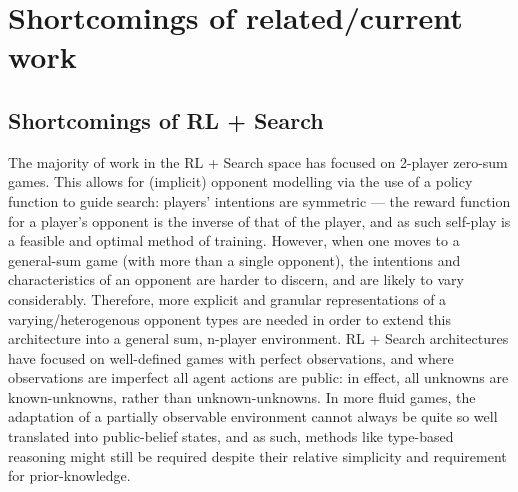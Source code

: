 \section{Shortcomings of related/current work}
\subsection{Shortcomings of RL + Search}
The majority of work in the RL + Search space has focused on 2-player zero-sum games. 
This allows for (implicit) opponent modelling via the use of a policy function to guide search: players' intentions are symmetric --- the reward function for a player's opponent is the inverse of that of the player, and as such self-play is a feasible and optimal method of training. 
However, when one moves to a general-sum game (with more than a single opponent), the intentions and characteristics of an opponent are harder to discern, and are likely to vary considerably. Therefore, more explicit and granular representations of a varying/heterogenous opponent types are needed in order to extend this architecture into a general sum, n-player environment.
\newline \newline
RL + Search architectures have focused on well-defined games with perfect observations, and where observations are imperfect all agent actions are public: in effect, all unknowns are known-unknowns, rather than unknown-unknowns. In more fluid games, the adaptation of a partially observable environment cannot always be quite so well translated into public-belief states, and as such, methods like type-based reasoning might still be required despite their relative simplicity and requirement for prior-knowledge.
